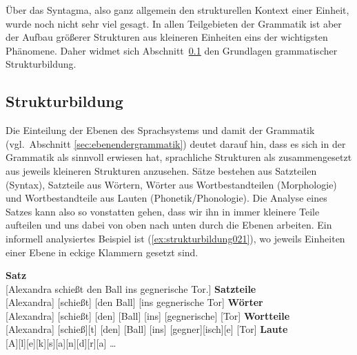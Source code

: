 
Über das Syntagma, also ganz allgemein den strukturellen Kontext einer Einheit, wurde noch nicht sehr viel gesagt.
In allen Teilgebieten der Grammatik ist aber der Aufbau größerer Strukturen aus kleineren Einheiten eins der wichtigsten Phänomene.
Daher widmet sich Abschnitt~\ref{sec:strukturbildung} den Grundlagen grammatischer Strukturbildung.


\subsection{Strukturbildung}
\label{sec:strukturbildung}

Die Einteilung der Ebenen des Sprachsystems und damit der Grammatik (vgl.\ Abschnitt \ref{sec:ebenendergrammatik}) deutet darauf hin, dass es sich in der Grammatik als sinnvoll erwiesen hat, sprachliche Strukturen als zusammengesetzt aus jeweils kleineren Strukturen anzusehen.
Sätze bestehen aus Satzteilen (Syntax), Satzteile aus Wörtern, Wörter aus Wortbestandteilen (Morphologie) und Wortbestandteile aus Lauten (Phonetik\slash Phonologie).
Die Analyse eines Satzes kann also so vonstatten gehen, dass wir ihn in immer kleinere Teile aufteilen und uns dabei von oben nach unten durch die Ebenen arbeiten.
Ein informell analysiertes Beispiel ist (\ref{ex:strukturbildung021}), wo jeweils Einheiten einer Ebene in eckige Klammern gesetzt sind.


\begin{exe}
  \ex\label{ex:strukturbildung021}
  \begin{xlist}
    \ex \textbf{Satz} \\
    {[Alexandra schießt den Ball ins gegnerische Tor.]}
    \ex \textbf{Satzteile} \\
    {[Alexandra] [schießt] [den Ball] [ins gegnerische Tor]}
    \ex \textbf{Wörter} \\
    {[Alexandra] [schießt] [den] [Ball] [ins] [gegnerische] [Tor]}
    \ex \textbf{Wortteile} \\
    {[Alexandra] [schieß][t] [den] [Ball] [ins] [gegner][isch][e] [Tor]}
    \ex \textbf{Laute} \\
    {[A][l][e][k][s][a][n][d][r][a] \ldots \\}
  \end{xlist}
\end{exe}

